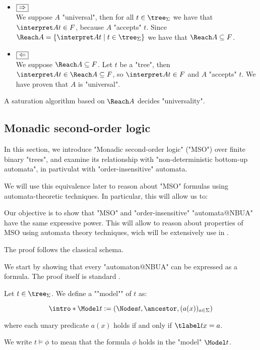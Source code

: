 \documentclass[a4paper,UKenglish,cleveref, autoref, thm-restate]{lipics-v2021}
\begin{document}
\begin{proofI}
	\begin{itemize}
		\item $\fbox{$\Rightarrow$}$\\
		      We suppose $A$ "universal", then for all $t \in \tree_\Sigma$ we have that $\interpret A t \in F$, because $A$ "accepts" $t$.
		      Since $\Reach A = \setdef {\interpret A t} {t\in \tree_\Sigma}$ we have that $\Reach A \subseteq F$.

		\item $\fbox{$\Leftarrow$}$\\
		      We suppose $\Reach A \subseteq F$. Let $t$ be a "tree", then $\interpret A t \in \Reach A \subseteq F$, so $\interpret A t \in F$ and $A$
		      "accepts" $t$. We have proven that $A$ is "universal".
	\end{itemize}
\end{proofI}


\begin{coro}\label{coro:univeral-Reach}
	A saturation algorithm based on $\Reach A$ decides "universality".
\end{coro}


\subsection{Monadic second-order logic}\label{sec:MSO}

In this section, we introduce "Monadic second-order logic" ("MSO") over finite binary "trees",
and examine its relationship with "non-deterministic bottom-up automata", in partivulat with "order-insensitive" automata.

We will use this equivalence later to reason about "MSO" formulas using automata-theoretic techniques. In particular, this will allow us to:

Our objective is to show that "MSO" and "order-insensitive" "automata@NBUA" have the same expressive power. This will allow to reason about
properties of MSO using automata theory techniques, wich will be extensively use in .

The proof follows the classical schema.

We start by showing that every "automaton@NBUA" can be expressed as a formula. The proof itself is standard \cite{Buchi60, Thomas1997, bookautomata}.

\begin{definition}
    \AP Let $t \in \tree_{\Sigma}$. We define a ""model"" of $t$ as:

	\[
		\intro* \Model t := (\Nodes t, \ancestor , (a (x))_{a \in \Sigma})
	\]

	where each unary predicate $a(x)$ holds if and only if $\tlabel t x = a$.

	We write $t \models \phi$ to mean that the formula $\phi$ holds in the "model" $\Model t$.
\end{definition}
\end{document}
